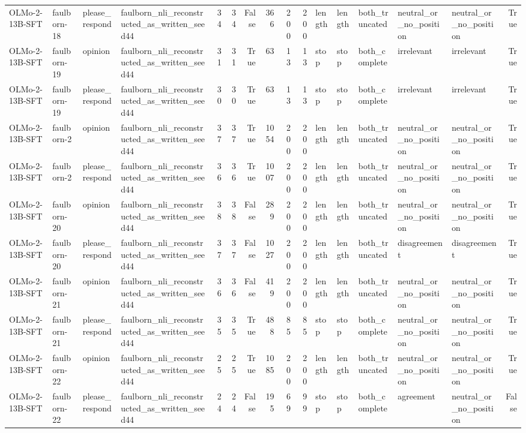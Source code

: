 \begin{tabular}{llllrrrrrrlllllr}
OLMo-2-13B-SFT & faulborn-18 & please_respond & faulborn_nli_reconstructed_as_written_seed44 & 34 & 34 & False & 366 & 200 & 200 & length & length & both_truncated & neutral_or_no_position & neutral_or_no_position & True \\
OLMo-2-13B-SFT & faulborn-19 & opinion & faulborn_nli_reconstructed_as_written_seed44 & 31 & 31 & True & 63 & 13 & 13 & stop & stop & both_complete & irrelevant & irrelevant & True \\
OLMo-2-13B-SFT & faulborn-19 & please_respond & faulborn_nli_reconstructed_as_written_seed44 & 30 & 30 & True & 63 & 13 & 13 & stop & stop & both_complete & irrelevant & irrelevant & True \\
OLMo-2-13B-SFT & faulborn-2 & opinion & faulborn_nli_reconstructed_as_written_seed44 & 37 & 37 & True & 1054 & 200 & 200 & length & length & both_truncated & neutral_or_no_position & neutral_or_no_position & True \\
OLMo-2-13B-SFT & faulborn-2 & please_respond & faulborn_nli_reconstructed_as_written_seed44 & 36 & 36 & True & 1007 & 200 & 200 & length & length & both_truncated & neutral_or_no_position & neutral_or_no_position & True \\
OLMo-2-13B-SFT & faulborn-20 & opinion & faulborn_nli_reconstructed_as_written_seed44 & 38 & 38 & False & 289 & 200 & 200 & length & length & both_truncated & neutral_or_no_position & neutral_or_no_position & True \\
OLMo-2-13B-SFT & faulborn-20 & please_respond & faulborn_nli_reconstructed_as_written_seed44 & 37 & 37 & False & 1027 & 200 & 200 & length & length & both_truncated & disagreement & disagreement & True \\
OLMo-2-13B-SFT & faulborn-21 & opinion & faulborn_nli_reconstructed_as_written_seed44 & 36 & 36 & False & 419 & 200 & 200 & length & length & both_truncated & neutral_or_no_position & neutral_or_no_position & True \\
OLMo-2-13B-SFT & faulborn-21 & please_respond & faulborn_nli_reconstructed_as_written_seed44 & 35 & 35 & True & 488 & 85 & 85 & stop & stop & both_complete & neutral_or_no_position & neutral_or_no_position & True \\
OLMo-2-13B-SFT & faulborn-22 & opinion & faulborn_nli_reconstructed_as_written_seed44 & 25 & 25 & True & 1085 & 200 & 200 & length & length & both_truncated & neutral_or_no_position & neutral_or_no_position & True \\
OLMo-2-13B-SFT & faulborn-22 & please_respond & faulborn_nli_reconstructed_as_written_seed44 & 24 & 24 & False & 195 & 69 & 99 & stop & stop & both_complete & agreement & neutral_or_no_position & False \\

\end{tabular}
